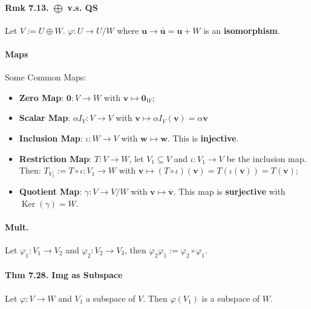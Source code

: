 \paragraph{Rmk 7.13. $\bigoplus$ v.s. QS} Let $V := U \oplus W$. $\varphi: U\rightarrow U/W$ where $\mathbf{u}\rightarrow\bar{\mathbf{u}}=\mathbf{u}+ W$ is an \textbf{isomorphism}.

\paragraph{Maps} Some Common Maps:
\begin{itemize}[noitemsep,nolistsep]
    \item \textbf{Zero Map}: $\mathbf{0}:V\rightarrow W$ with $\mathbf{v} \mapsto \mathbf{0}_W$;
    \item \textbf{Scalar Map}: $\alpha I_V:V\rightarrow V$ with $\mathbf{v}\mapsto \alpha I_V(\mathbf{v})= \alpha\mathbf{v}$
    \item \textbf{Inclusion Map}: $\iota : W\rightarrow V$ with $\mathbf{w}\mapsto \mathbf{w}$. This is \textbf{injective}.
    \item \textbf{Restriction Map}: $T:V\rightarrow W$, let $V_1\subseteq V$ and $\iota: V_1\rightarrow V$ be the inclusion map. Then: $T_{V_1}:=T\circ \iota: V_1 \rightarrow W$ with $\mathbf{v}\mapsto (T\circ \iota)(\mathbf{v}) = T(\iota(\mathbf{v})) = T(\mathbf{v})$;
    \item \textbf{Quotient Map}: $\gamma : V\rightarrow V/W$ with $\mathbf{v}\mapsto \overline{\mathbf{v}}$. This map is \textbf{surjective} with $\operatorname{Ker}(\gamma) = W$.
\end{itemize}

\paragraph{Mult.} Let $\varphi_1:V_1\rightarrow V_2$ and $\varphi_2:V_2\rightarrow V_3$, then $\varphi_2\varphi_1:=\varphi_2\circ\varphi_1$.

\paragraph{Thm 7.28. Img as Subspace} Let $\varphi: V\rightarrow W$ and $V_1$ a subspace of $V$. Then $\varphi(V_1)$ is a subspace of $W$.

